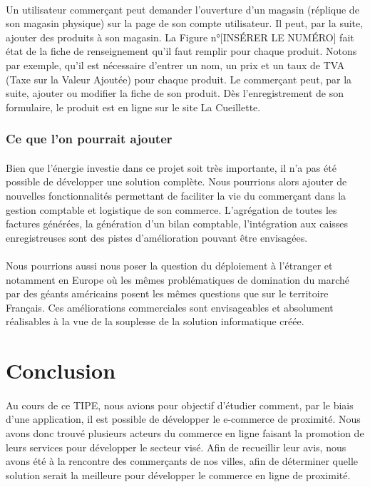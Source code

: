 \documentclass[a4paper, 12pt]{article}
\begin{document}
\paragraph{}Un utilisateur commerçant peut demander l’ouverture d’un magasin (réplique de son magasin physique) sur la page de son compte utilisateur. Il peut, par la suite, ajouter des produits à son magasin.  La Figure n°[INSÉRER LE NUMÉRO] fait état de la fiche de renseignement qu’il faut remplir pour chaque produit. Notons par exemple, qu’il est nécessaire d’entrer un nom, un prix et un taux de TVA (Taxe sur la Valeur Ajoutée) pour chaque produit. Le commerçant peut, par la suite, ajouter ou modifier la fiche de son produit. Dès l’enregistrement de son formulaire, le produit est en ligne sur le site La Cueillette.

\subsubsection{Ce que l'on pourrait ajouter}

\paragraph{}Bien que l’énergie investie dans ce projet soit très importante, il n’a pas été possible de développer une solution complète. Nous pourrions alors ajouter de nouvelles fonctionnalités permettant de faciliter la vie du commerçant dans la gestion comptable et logistique de son commerce. L’agrégation de toutes les factures générées, la génération d’un bilan comptable, l’intégration aux caisses enregistreuses sont des pistes d’amélioration pouvant être envisagées.
\paragraph{}Nous pourrions aussi nous poser la question du déploiement à l’étranger et notamment en Europe où les mêmes problématiques de domination du marché par des géants américains posent les mêmes questions que sur le territoire Français. Ces améliorations commerciales sont envisageables et absolument réalisables à la vue de la souplesse de la solution informatique créée.


\newpage
\section{Conclusion}

\paragraph{}Au cours de ce TIPE, nous avions pour objectif d’étudier comment, par le biais d’une application, il est possible de développer le e-commerce de proximité. Nous avons donc trouvé plusieurs acteurs du commerce en ligne faisant la promotion de leurs services pour développer le secteur visé. Afin de recueillir leur avis, nous avons été à la rencontre des commerçants de nos villes, afin de déterminer quelle solution serait la meilleure pour développer le commerce en ligne de proximité.
\end{document}
